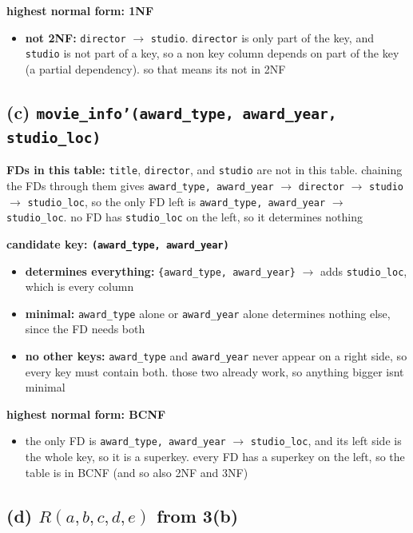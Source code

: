 \documentclass[11pt]{article}
\newcommand{\at}[1]{\texttt{#1}}
\begin{document}
\noindent\textbf{highest normal form: 1NF}
\begin{itemize}
  \item \textbf{not 2NF:} \at{director} $\to$ \at{studio}. \at{director} is
    only part of the key, and \at{studio} is not part of a key, so a non key
    column depends on part of the key (a partial dependency). so that means
    its not in 2NF
\end{itemize}

\subsection*{(c) \at{movie\_info'(award\_type, award\_year, studio\_loc)}}

\noindent\textbf{FDs in this table:} \at{title}, \at{director}, and
\at{studio} are not in this table. chaining the FDs through them gives
\at{award\_type, award\_year} $\to$ \at{director} $\to$ \at{studio} $\to$
\at{studio\_loc}, so the only FD left is \at{award\_type, award\_year} $\to$
\at{studio\_loc}. no FD has \at{studio\_loc} on the left, so it determines
nothing

\medskip
\noindent\textbf{candidate key: \at{(award\_type, award\_year)}}
\begin{itemize}
  \item \textbf{determines everything:} \at{\{award\_type, award\_year\}}
    $\to$ adds \at{studio\_loc}, which is every column
  \item \textbf{minimal:} \at{award\_type} alone or \at{award\_year} alone
    determines nothing else, since the FD needs both
  \item \textbf{no other keys:} \at{award\_type} and \at{award\_year} never
    appear on a right side, so every key must contain both. those two
    already work, so anything bigger isnt minimal
\end{itemize}

\noindent\textbf{highest normal form: BCNF}
\begin{itemize}
  \item the only FD is \at{award\_type, award\_year} $\to$ \at{studio\_loc},
    and its left side is the whole key, so it is a superkey. every FD has a
    superkey on the left, so the table is in BCNF (and so also 2NF and 3NF)
\end{itemize}

\subsection*{(d) $R(a,b,c,d,e)$ from 3(b)}
\end{document}
